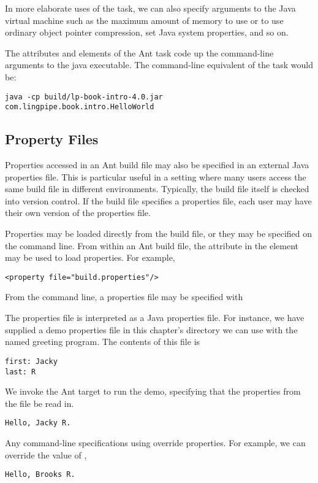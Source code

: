 In more elaborate uses of the  task, we can also specify
arguments to the Java virtual machine such as the maximum amount of
memory to use or to use ordinary object pointer compression, set Java
system properties, and so on.

The attributes and elements of the Ant  task code up the
command-line arguments to the java executable.
The command-line equivalent of the  task would be:
%
\begin{verbatim}
java -cp build/lp-book-intro-4.0.jar com.lingpipe.book.intro.HelloWorld
\end{verbatim}
%

\subsection{Property Files}

Properties accessed in an Ant build file may also be specified in an
external Java properties file.  This is particular useful in a setting
where many users access the same build file in different environments.
Typically, the build file itself is checked into version control.  If
the build file specifies a properties file, each user may have their
own version of the properties file.

Properties may be loaded directly from the build file, or they may be
specified on the command line.  From within an Ant build file, the
 attribute in the  element may be used to
load properties.  For example,
%
\begin{verbatim}
<property file="build.properties"/>
\end{verbatim}
%
From the command line, a properties file may be specified with
%

The properties file is interpreted as a Java properties file.  For
instance, we have supplied a demo properties file
 in this chapter's directory we can use with
the named greeting program.  The contents of this file is
%
\begin{verbatim}
first: Jacky
last: R
\end{verbatim}
%
We invoke the Ant target  to run the demo,
specifying that the properties from the file 
be read in.
%
\begin{verbatim}
Hello, Jacky R.
\end{verbatim}
%
Any command-line specifications using  override properties.
For example, we can override the value of ,
%
\begin{verbatim}
Hello, Brooks R.
\end{verbatim}


